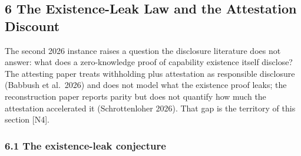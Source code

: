 \documentclass[
  11pt,
]{article}
\begin{document}
\subsection{6 The Existence-Leak Law and the Attestation
Discount}\label{the-existence-leak-law-and-the-attestation-discount}

The second 2026 instance raises a question the disclosure literature
does not answer: what does a zero-knowledge proof of capability
existence itself disclose? The attesting paper treats withholding plus
attestation as responsible disclosure (Babbush et al.~2026) and does not
model what the existence proof leaks; the reconstruction paper reports
parity but does not quantify how much the attestation accelerated it
(Schrottenloher 2026). That gap is the territory of this section
{[}N4{]}.

\subsubsection{6.1 The existence-leak
conjecture}\label{the-existence-leak-conjecture}
\end{document}
